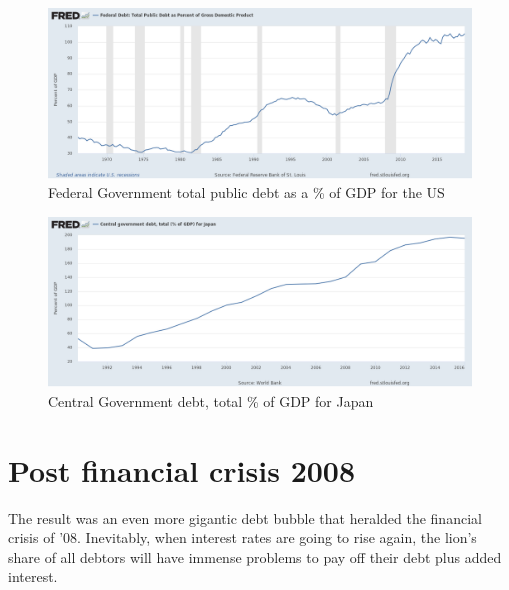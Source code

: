     \begin{figure}
        \centering
        \caption{Federal Government total public debt as a \% of GDP for the US}
        \includegraphics[width=\textwidth]{img/ch-history/fredgraph_debt_US.png}
       
        \label{fig:fedgraph_debt_US}
    \end{figure}
    
    \begin{figure}
        \centering
        \caption{Central Government debt, total \% of GDP for Japan}
        \includegraphics[width=\textwidth]{img/ch-history/fredgraph_debt_JPN.png}
       
        \label{fig:fedgraph_debt_JPN}
    \end{figure}

\section{Post financial crisis 2008}
        
The result was an even more gigantic debt bubble that heralded the financial crisis of '08. Inevitably, when interest rates are going to rise again, the lion's share of all debtors will have immense problems to pay off their debt plus added interest.\medskip 



